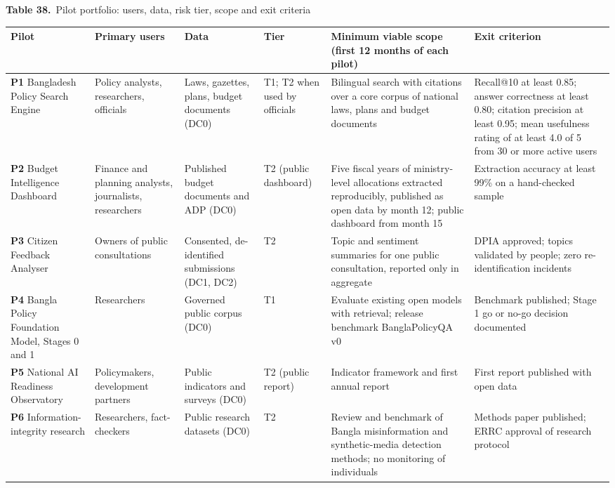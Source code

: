 \documentclass[border=10pt]{standalone}
\begin{document}
\begin{minipage}{22cm}
{\large\bfseries Table 38.}\ {\large Pilot portfolio: users, data, risk tier, scope and exit criteria}\par\vspace{7pt}
\small
{}
\begin{tabularx}{\linewidth}{@{}>{\hsize=0.981\hsize\raggedright\arraybackslash}X>{\hsize=0.923\hsize\raggedright\arraybackslash}X>{\hsize=0.808\hsize\raggedright\arraybackslash}X>{\hsize=0.519\hsize\raggedright\arraybackslash}X>{\hsize=1.500\hsize\raggedright\arraybackslash}X>{\hsize=1.269\hsize\raggedright\arraybackslash}X@{}}
\arrayrulecolor{bapilrule}\toprule
\rowcolor{white}\textbf{Pilot} & \textbf{Primary users} & \textbf{Data} & \textbf{Tier} & \textbf{Minimum viable scope (first 12 months of each pilot)} & \textbf{Exit criterion} \\
\midrule
\textbf{P1} Bangladesh Policy Search Engine & Policy analysts, researchers, officials & Laws, gazettes, plans, budget documents (DC0) & T1; T2 when used by officials & Bilingual search with citations over a core corpus of national laws, plans and budget documents & Recall@10 at least 0.85; answer correctness at least 0.80; citation precision at least 0.95; mean usefulness rating of at least 4.0 of 5 from 30 or more active users \\
\textbf{P2} Budget Intelligence Dashboard & Finance and planning analysts, journalists, researchers & Published budget documents and ADP (DC0) & T2 (public dashboard) & Five fiscal years of ministry-level allocations extracted reproducibly, published as open data by month 12; public dashboard from month 15 & Extraction accuracy at least 99\% on a hand-checked sample \\
\textbf{P3} Citizen Feedback Analyser & Owners of public consultations & Consented, de-identified submissions (DC1, DC2) & T2 & Topic and sentiment summaries for one public consultation, reported only in aggregate & DPIA approved; topics validated by people; zero re-identification incidents \\
\textbf{P4} Bangla Policy Foundation Model, Stages 0 and 1 & Researchers & Governed public corpus (DC0) & T1 & Evaluate existing open models with retrieval; release benchmark BanglaPolicyQA v0 & Benchmark published; Stage 1 go or no-go decision documented \\
\textbf{P5} National AI Readiness Observatory & Policymakers, development partners & Public indicators and surveys (DC0) & T2 (public report) & Indicator framework and first annual report & First report published with open data \\
\textbf{P6} Information-integrity research & Researchers, fact-checkers & Public research datasets (DC0) & T2 & Review and benchmark of Bangla misinformation and synthetic-media detection methods; no monitoring of individuals & Methods paper published; ERRC approval of research protocol \\
\bottomrule
\end{tabularx}
\par{}
\end{minipage}
\end{document}
